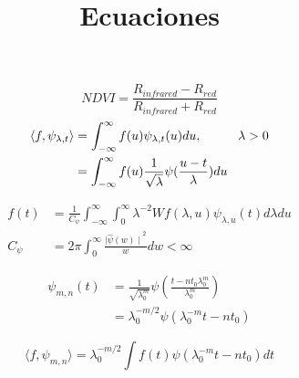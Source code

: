 \documentclass{article}
\newcommand\tab[1][1cm]{\hspace*{#1}}
\begin{document}
\title{Ecuaciones}
\maketitle

\begin{equation}
NDVI = \frac{R_{infrared}-R_{red}}{R_{infrared}+R_{red}}
\end{equation}
\begin{align}
\langle f, \psi_{\lambda,t} \rangle&= \int_{-\infty}^{\infty}{f(u)}\psi_{\lambda,t}(u)du,\tab{\lambda>0}\\
&=\int_{-\infty}^{\infty}{f(u)}\frac{1}{\sqrt{\lambda}}\psi(\frac{u-t}{\lambda}) du
\end{align}

\begin{align}
f(t)&=\frac{1}{C_{\psi}}\int_{-\infty}^{\infty}\int_{0}^{\infty}\lambda^{-2}Wf(\lambda,u)\psi_{\lambda,u}(t)d\lambda du\\
C_{\psi}&=2\pi\int_{0}^{\infty}\frac{{\mid\hat{\psi}(w)\mid}^2}{w}dw<\infty
\end{align}

\begin{align}
\psi_{m,n}(t)&= \frac{1}{\sqrt{\lambda_{0}^m}}{\psi}{(\frac{t-nt_{0}\lambda_{0}^m}{\lambda_{0}^m})}\\
&=\lambda_{0}^{{-m/2}}{\psi}{(\lambda_{0}^{-m}t-nt_{0})}
\end{align}

\begin{equation}
\langle f,\psi_{m,n} \rangle = \lambda_{0}^{-m/2}\int{f(t)}{\psi(\lambda_{0}^{-m}t-nt_{0})}dt
\end{equation}
\end{document}
